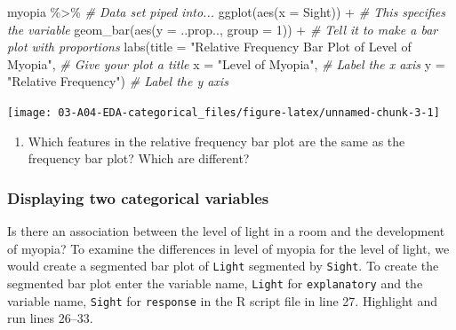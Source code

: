 \documentclass[
]{report}
\newenvironment{Shaded}{\begin{snugshade}}{\end{snugshade}}
\newcommand{\AttributeTok}[1]{\textcolor[rgb]{0.77,0.63,0.00}{#1}}
\newcommand{\CommentTok}[1]{\textcolor[rgb]{0.56,0.35,0.01}{\textit{#1}}}
\newcommand{\DecValTok}[1]{\textcolor[rgb]{0.00,0.00,0.81}{#1}}
\newcommand{\FunctionTok}[1]{\textcolor[rgb]{0.00,0.00,0.00}{#1}}
\newcommand{\NormalTok}[1]{#1}
\newcommand{\SpecialCharTok}[1]{\textcolor[rgb]{0.00,0.00,0.00}{#1}}
\newcommand{\StringTok}[1]{\textcolor[rgb]{0.31,0.60,0.02}{#1}}
\providecommand{\tightlist}{%
  \setlength{\itemsep}{0pt}\setlength{\parskip}{0pt}}
\begin{document}
\begin{Shaded}
\begin{Highlighting}[]
\NormalTok{myopia }\SpecialCharTok{\%\textgreater{}\%} \CommentTok{\# Data set piped into...}
\FunctionTok{ggplot}\NormalTok{(}\FunctionTok{aes}\NormalTok{(}\AttributeTok{x =}\NormalTok{ Sight)) }\SpecialCharTok{+}   \CommentTok{\# This specifies the variable}
  \FunctionTok{geom\_bar}\NormalTok{(}\FunctionTok{aes}\NormalTok{(}\AttributeTok{y =}\NormalTok{ ..prop.., }\AttributeTok{group =} \DecValTok{1}\NormalTok{)) }\SpecialCharTok{+}  \CommentTok{\# Tell it to make a bar plot with proportions}
  \FunctionTok{labs}\NormalTok{(}\AttributeTok{title =} \StringTok{"Relative Frequency Bar Plot of Level of Myopia"}\NormalTok{,  }\CommentTok{\# Give your plot a title}
       \AttributeTok{x =} \StringTok{"Level of Myopia"}\NormalTok{,   }\CommentTok{\# Label the x axis}
       \AttributeTok{y =} \StringTok{"Relative Frequency"}\NormalTok{)  }\CommentTok{\# Label the y axis}
\end{Highlighting}
\end{Shaded}

\begin{center}\texttt{[image: 03-A04-EDA-categorical\_files/figure-latex/unnamed-chunk-3-1]} \end{center}

\begin{enumerate}
\def\labelenumi{\arabic{enumi}.}
\setcounter{enumi}{4}
\tightlist
\item
  Which features in the relative frequency bar plot are the same as the frequency bar plot? Which are different?
\end{enumerate}

\newpage

\hypertarget{displaying-two-categorical-variables}{%
\subsubsection*{Displaying two categorical variables}\label{displaying-two-categorical-variables}}

Is there an association between the level of light in a room and the development of myopia? To examine the differences in level of myopia for the level of light, we would create a segmented bar plot of \texttt{Light} segmented by \texttt{Sight}. To create the segmented bar plot enter the variable name, \texttt{Light} for \texttt{explanatory} and the variable name, \texttt{Sight} for \texttt{response} in the R script file in line 27. Highlight and run lines 26--33.
\end{document}
